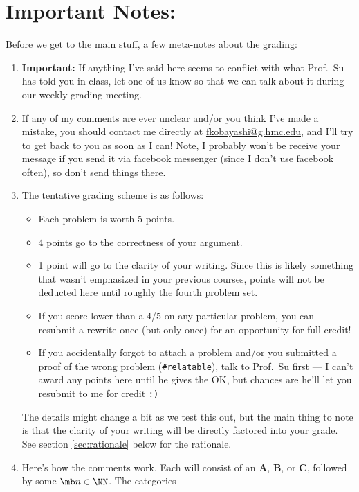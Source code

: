 \documentclass{fkpset}
\begin{document}
\section{Important Notes:}
Before we get to the main stuff, a few meta-notes about the grading:
\begin{enumerate}[label=(\arabic*)]
  \item \textbf{Important:} If anything I've said here seems to conflict with
    what Prof.\ Su has told you in class, let one of us know so that we can talk
    about it during our weekly grading meeting.
  \item If any of my comments are ever unclear and/or you think I've made a
    mistake, you should contact me directly at
    \href{mailto:fkobayashi@g.hmc.edu}{fkobayashi@g.hmc.edu}, and I'll try to
    get back to you as soon as I can! Note, I probably won't be receive your
    message if you send it via facebook messenger (since I don't use facebook
    often), so don't send things there.
  \item The tentative grading scheme is as follows:
    \begin{itemize}
      \item Each problem is worth 5 points.
      \item 4 points go to the correctness of your argument.
      \item 1 point will go to the clarity of your writing. Since this is likely
        something that wasn't emphasized in your previous courses, points will
        not be deducted here until roughly the fourth problem set.
      \item If you score lower than a 4/5 on any particular problem, you can
        resubmit a rewrite once (but only once) for an opportunity for full
        credit!
      \item If you accidentally forgot to attach a problem and/or you submitted
        a proof of the wrong problem (\texttt{\#relatable}), talk to Prof.\ Su
        first --- I can't award any points here until he gives the OK, but
        chances are he'll let you resubmit to me for credit \texttt{:)}
    \end{itemize}
    The details might change a bit as we test this out, but the main thing to
    note is that the clarity of your writing will be directly factored into your
    grade. See section \ref{sec:rationale} below for the rationale.
  \item Here's how the comments work. Each will consist of an \textbf{A},
    \textbf{B}, or \textbf{C}, followed by some $\mb n \in \NN$. The categories

\end{enumerate}
\end{document}
